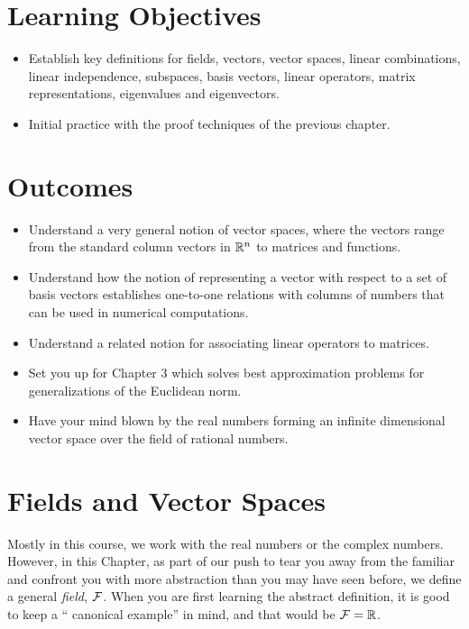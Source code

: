 \section*{Learning Objectives}

\begin{itemize}
\item Establish key definitions for fields, vectors, vector spaces, linear combinations, linear independence, subspaces, basis vectors, linear operators, matrix representations, eigenvalues and eigenvectors.
\item Initial practice with the proof techniques of the previous chapter.
\end{itemize}

\section*{Outcomes} 
\begin{itemize}
\item Understand a very general notion of vector spaces, where the vectors range from the standard column vectors in $\mathbb R^n$ to matrices and functions.

\item Understand how the notion of representing a vector with respect to a set of basis vectors establishes one-to-one relations with columns of numbers that can be used in numerical computations.

\item Understand a related notion for associating linear operators to matrices.

\item Set you up for Chapter 3 which solves best approximation problems for generalizations of the Euclidean norm.

\item Have your mind blown by the real numbers forming an infinite dimensional vector space over the field of rational numbers. 


\end{itemize}

\newpage

\section{Fields and Vector Spaces}

Mostly in this course, we work with the real numbers or the complex numbers. However, in this Chapter, as part of our push to tear you away from the familiar and confront you with more abstraction than you may have seen before, we define a general \emph{field}, ${\cal F}$. When you are first learning the abstract definition, it is good to keep a `` canonical example'' in mind, and that would be ${\cal F} = \mathbb R$.\\


